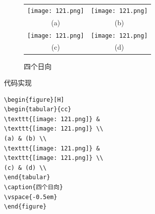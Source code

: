 \documentclass[cn,chinese,color=cyan]{elegantbook}
\begin{document}
\begin{figure}[H]
\begin{tabular}{cc}
	\texttt{[image: 121.png]} &
	\texttt{[image: 121.png]} \\
	(a) & (b) \\
	\texttt{[image: 121.png]} &
	\texttt{[image: 121.png]} \\
	(c) & (d) \\
\end{tabular}
\caption{四个日向}
\vspace{-0.5em}
\end{figure}
代码实现
\begin{lstlisting}[style=R]
\begin{figure}[H]
\begin{tabular}{cc}
\texttt{[image: 121.png]} &
\texttt{[image: 121.png]} \\
(a) & (b) \\
\texttt{[image: 121.png]} &
\texttt{[image: 121.png]} \\
(c) & (d) \\
\end{tabular}
\caption{四个日向}
\vspace{-0.5em}
\end{figure}
\end{lstlisting}
\end{document}
